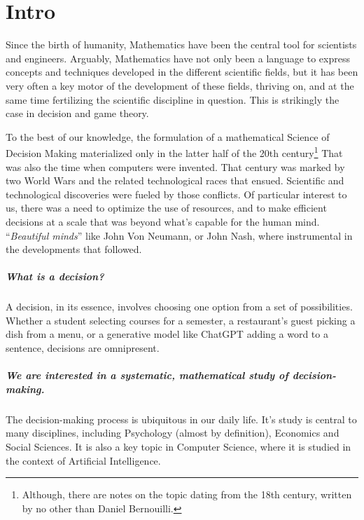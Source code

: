 \ifx \globalmark \undefined %
	
\else

\fi



\chapter*{Intro}
\label{chap:intro}

Since the birth of humanity,
Mathematics have been the central tool for scientists and engineers.
Arguably, Mathematics have not only been a language to express concepts
and techniques developed in the different scientific fields,
but it has been very often a key motor of the development of these fields,
thriving on, and at the same time fertilizing the scientific discipline in question.
This is strikingly the case in decision and game theory.

To the best of our knowledge, the formulation of a mathematical Science of Decision Making materialized only in the latter half of the 20th century\footnote{Although, there are notes on the topic dating from the 18th century, written by no other than Daniel Bernouilli.}
That was also the time when computers were invented. That century was marked by two World Wars and the related technological races that ensued.
Scientific and technological discoveries were fueled by those conflicts.
Of particular interest to us, there was a need to optimize the use of resources,
and to make efficient decisions at a scale that was beyond what's capable for the human mind.
``\emph{Beautiful minds}'' like John Von Neumann, or John Nash, where instrumental in the developments that followed.

\paragraph{What is a decision?}
A decision, in its essence,
involves choosing one option from a set of possibilities.
Whether a student selecting courses for a semester,
a restaurant's guest picking a dish from a menu,
or a generative model like ChatGPT adding a word to a sentence,
decisions are omnipresent.

\paragraph{We are interested in a systematic, mathematical study of decision-making.}
The decision-making process is ubiquitous in our daily life. It's study is central to many disciplines,
including Psychology (almost by definition), Economics and Social Sciences.
It is also a key topic in Computer Science, where it is studied in the context of Artificial Intelligence.

